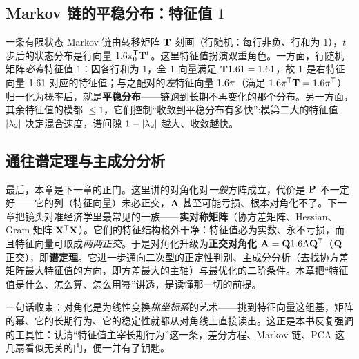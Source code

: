 \subsection*{Markov 链的平稳分布：特征值 $1$}

一条有限状态 Markov 链由转移矩阵 $\mathbf{T}$ 刻画（行随机：每行非负、行和为 $1$），$t$ 步后的状态分布是行向量 $1.6\pi_0^{\mathsf{T}}\mathbf{T}^t$。这里特征值扮演双重角色。一方面，行随机矩阵\emph{必有}特征值 $1$：因各行和为 $1$，全 $1$ 向量满足 $\mathbf{T}1.6 1=1.6 1$，故 $1$ 是右特征向量 $1.6 1$ 对应的特征值；与之配对的\emph{左}特征向量 $1.6\pi$（满足 $1.6\pi^{\mathsf{T}}\mathbf{T}=1.6\pi^{\mathsf{T}}$）归一化为概率后，就是\textbf{平稳分布}——链跑到长期不再变化的那个分布。另一方面，其余特征值的模都 $\le1$，它们控制``收敛到平稳分布有多快'':模第二大的特征值 $\left|\lambda_2\right|$ 决定混合速度，谱间隙 $1-\left|\lambda_2\right|$ 越大、收敛越快。


\subsection*{通往谱定理与主成分分析}

最后，本章是下一章的正门。这里讲的对角化对\emph{一般}方阵成立，代价是 $\mathbf{P}$ 不一定好——它的列（特征向量）未必正交，$\mathbf{A}$ 甚至可能亏损、根本对角化不了。下一章把镜头对准经济学里最常见的一族——\textbf{实对称矩阵}（协方差矩阵、Hessian、Gram 矩阵 $\mathbf{X}^{\mathsf{T}}\mathbf{X}$）。它们的特征结构格外干净：特征值必为实数、永不亏损，而且特征向量可取成\emph{两两正交}。于是对角化升级为\textbf{正交对角化} $\mathbf{A}=\mathbf{Q}1.6\Lambda\mathbf{Q}^{\mathsf{T}}$（$\mathbf{Q}$ 正交），即\textbf{谱定理}。它进一步通向二次型的正定性判别、主成分分析（去找协方差矩阵最大特征值的方向，即方差最大的主轴）与最优化的二阶条件。本章把``特征值是什么、怎么算、怎么用幂''讲透，是读懂那一切的前提。

一句话收束：对角化是为线性变换\emph{挑坐标系}的艺术——挑到特征向量这组基，矩阵的幂、它的长期行为、它的稳定性就都从对角线上直接读出。这正是本书反复强调的工具性：认清``特征值主宰长期行为''这一条，差分方程、Markov 链、PCA 这几扇看似无关的门，便一并有了钥匙。
